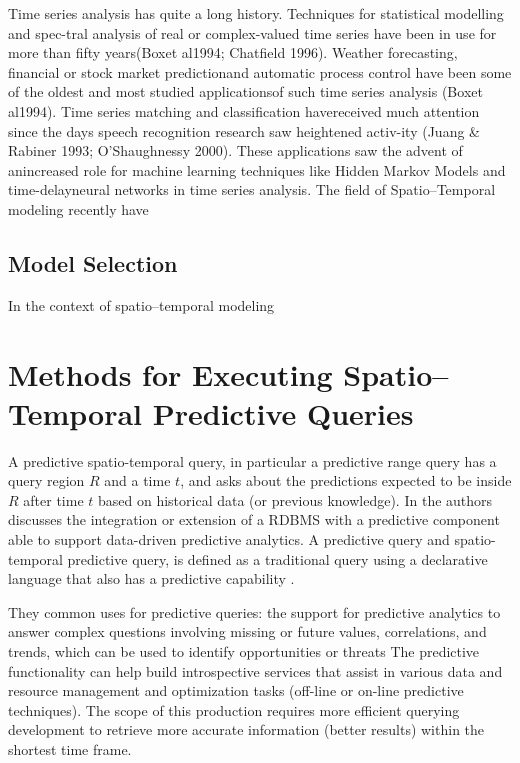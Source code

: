 Time series analysis has quite a long history. Techniques for statistical modelling and spec-tral analysis of real or complex-valued time series have been in use for more than fifty years(Boxet al1994; Chatfield 1996). Weather forecasting, financial or stock market predictionand automatic process control have been some of the oldest and most studied applicationsof such time series analysis (Boxet al1994). Time series matching and classification havereceived much attention since the days speech recognition research saw heightened activ-ity (Juang & Rabiner 1993; O’Shaughnessy 2000). These applications saw the advent of anincreased role for machine learning techniques like Hidden Markov Models and time-delayneural networks in time series analysis.
The field of Spatio--Temporal modeling recently have 

\subsection{Model Selection}
\label{Sec:STModelSelection}

In the context of spatio--temporal modeling 

\section{Methods for Executing Spatio--Temporal Predictive Queries}
\label{Sec:RelatedWorksQueries}

A predictive spatio-temporal query, in particular a predictive range query has a query region $R$ and a time $t$, and asks about the predictions expected to be inside $R$ after time $t$ based on historical data (or previous knowledge).  In \cite{Akdere2011} the authors discusses the integration or extension of a RDBMS with a predictive component able to support data-driven predictive analytics. A predictive query and spatio-temporal predictive query, is defined as a traditional query using a declarative language that also has a predictive capability \cite{Hendawi2012}. 

They common uses for predictive queries: the support for predictive analytics to answer complex questions involving missing or future values, correlations, and trends, which  can be used to identify opportunities or threats
The predictive functionality can help build introspective services that assist in various data and resource management and optimization tasks (off-line or on-line predictive techniques). 
The  scope  of  this  production requires  more  efficient  querying development to  retrieve more accurate  information (better results)  within  the  shortest time  frame.


